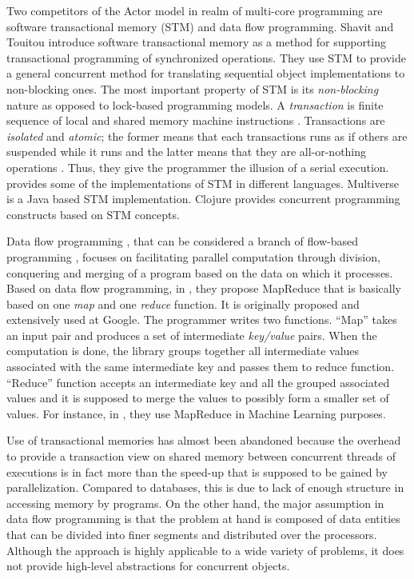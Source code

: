 Two competitors of the Actor model in realm of multi-core programming are
software transactional memory (STM) and data flow programming. Shavit and
Touitou \cite{stm_shavit_touitou} introduce software transactional memory as a
method for supporting transactional programming  of synchronized operations.
They use STM to provide a general concurrent method for translating sequential
object implementations to non-blocking ones. The most important property of STM
is its \textit{non-blocking} nature as opposed to lock-based programming models.
A \textsl{transaction} is finite sequence of local and shared memory machine
instructions \cite{stm_shavit_touitou}. Transactions are \textit{isolated} and
\textit{atomic}; the former means that each transactions runs as if others are
suspended while it runs and the latter means that they are all-or-nothing
operations \cite{stm_Adl-Tabatabai}. Thus, they give the programmer the illusion
of a serial execution. \cite{wiki:stm:impl} provides some of the implementations
of STM in different languages.
%
Multiverse \cite{multiverse_homepage} is a Java based STM implementation.
Clojure \cite{clojure:web,clojure_concurrent:web} provides concurrent programming
constructs based on STM concepts.

Data flow programming \cite{dataflow_prog:wiki}, that can be considered a branch
of flow-based programming \cite{flow_prog:wiki}, focuses on facilitating
parallel computation through division, conquering and merging of a program based
on the data on which it processes. Based on data flow programming, in
\cite{mapreduce:dean_ghemawat}, they propose MapReduce that is basically based
on one \textit{map} and one \textit{reduce} function. It is originally proposed
and extensively used at Google. The programmer writes two functions. ``Map''
takes an input pair and produces a set of intermediate \textsl{key/value} pairs.
When the computation is done, the library groups together all intermediate
values associated with the same intermediate key and passes them to reduce
function. ``Reduce'' function accepts an intermediate key and all the grouped
associated values and it is supposed to merge the values to possibly form a
smaller set of values. For instance, in \cite{mapreduce_ml:cheng}, they use
MapReduce in Machine Learning purposes.


Use of transactional memories has almost been abandoned because the overhead
\cite{stm_Cascaval} to provide a transaction view on shared memory between
concurrent threads of executions is in fact more than the speed-up that is
supposed to be gained by parallelization. Compared to databases, this is due to
lack of enough structure in accessing memory by programs. On the other hand, the
major assumption in data flow programming is that the problem at hand is
composed of data entities that can be divided into finer segments and
distributed over the processors. Although the approach is highly applicable to
a wide variety of problems, it does not provide high-level abstractions for
concurrent objects.

